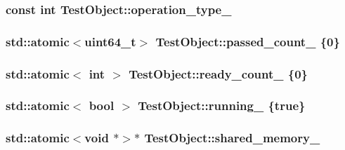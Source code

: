 \subsubsection[{operation\+\_\+type\+\_\+}]{\setlength{\rightskip}{0pt plus 5cm}const int Test\+Object\+::operation\+\_\+type\+\_\+}\label{class_test_object_a034546a627911670749ab574d92831b5}
\hypertarget{class_test_object_a7f2ec3b2d643f50a441e84e3bce407da}{}
\subsubsection[{passed\+\_\+count\+\_\+}]{\setlength{\rightskip}{0pt plus 5cm}std\+::atomic$<$uint64\+\_\+t$>$ Test\+Object\+::passed\+\_\+count\+\_\+ \{0\}}\label{class_test_object_a7f2ec3b2d643f50a441e84e3bce407da}
\hypertarget{class_test_object_aacfa3985ea1d4427319f97cc813d2a91}{}
\subsubsection[{ready\+\_\+count\+\_\+}]{\setlength{\rightskip}{0pt plus 5cm}std\+::atomic$<$ int $>$ Test\+Object\+::ready\+\_\+count\+\_\+ \{0\}}\label{class_test_object_aacfa3985ea1d4427319f97cc813d2a91}
\hypertarget{class_test_object_a6bb349ea0af5dc9a56214b3ba911d544}{}
\subsubsection[{running\+\_\+}]{\setlength{\rightskip}{0pt plus 5cm}std\+::atomic$<$ bool $>$ Test\+Object\+::running\+\_\+ \{{\bf true}\}}\label{class_test_object_a6bb349ea0af5dc9a56214b3ba911d544}
\hypertarget{class_test_object_a5a0bcec98ef2512f1c62e330522b6df0}{}
\subsubsection[{shared\+\_\+memory\+\_\+}]{\setlength{\rightskip}{0pt plus 5cm}std\+::atomic$<$void $\ast$$>$$\ast$ Test\+Object\+::shared\+\_\+memory\+\_\+}\label{class_test_object_a5a0bcec98ef2512f1c62e330522b6df0}
\hypertarget{class_test_object_a7e8e641112366f90c14d458b6167bee1}{}
